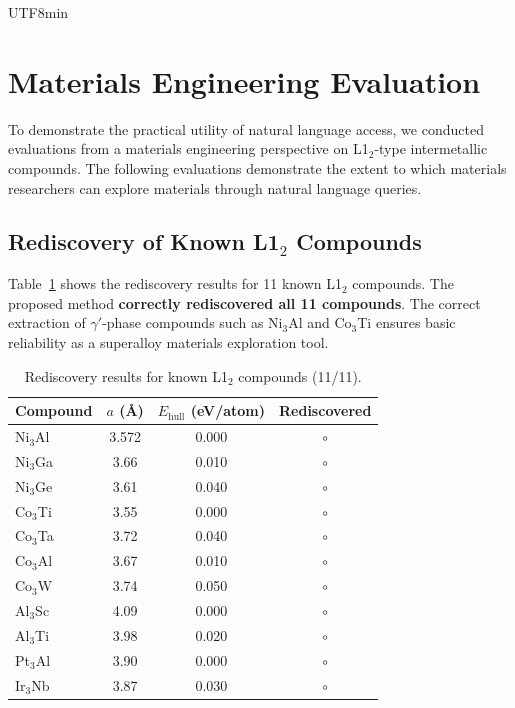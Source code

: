 \documentclass[sn-mathphys,Numbered]{sn-jnl}
\begin{document}
\begin{CJK}{UTF8}{min}
\section{Materials Engineering Evaluation}
\label{sec:materials_evaluation}

To demonstrate the practical utility of natural language access,
we conducted evaluations from a materials engineering perspective
on L1$_2$-type intermetallic compounds.
The following evaluations demonstrate the extent to which
materials researchers can explore materials through natural
language queries.

\subsection{Rediscovery of Known L1$_2$ Compounds}

Table~\ref{tab:known_l12} shows the rediscovery results for
11 known L1$_2$ compounds.
The proposed method \textbf{correctly rediscovered all 11 compounds}.
The correct extraction of $\gamma'$-phase compounds such as
Ni$_3$Al and Co$_3$Ti ensures basic reliability as a superalloy
materials exploration tool.

\begin{table}[t]
  \centering
  \caption{Rediscovery results for known L1$_2$ compounds (11/11).}
  \label{tab:known_l12}
  \small
  \begin{tabular}{lccc}
    \toprule
    Compound & $a$ (\AA) & $E_\text{hull}$ (eV/atom) & Rediscovered \\
    \midrule
    Ni$_3$Al & 3.572 & 0.000 & $\circ$ \\
    Ni$_3$Ga & 3.66 & 0.010 & $\circ$ \\
    Ni$_3$Ge & 3.61 & 0.040 & $\circ$ \\
    Co$_3$Ti & 3.55 & 0.000 & $\circ$ \\
    Co$_3$Ta & 3.72 & 0.040 & $\circ$ \\
    Co$_3$Al & 3.67 & 0.010 & $\circ$ \\
    Co$_3$W  & 3.74 & 0.050 & $\circ$ \\
    Al$_3$Sc & 4.09 & 0.000 & $\circ$ \\
    Al$_3$Ti & 3.98 & 0.020 & $\circ$ \\
    Pt$_3$Al & 3.90 & 0.000 & $\circ$ \\
    Ir$_3$Nb & 3.87 & 0.030 & $\circ$ \\
    \bottomrule
  \end{tabular}
\end{table}


\end{CJK}
\end{document}
